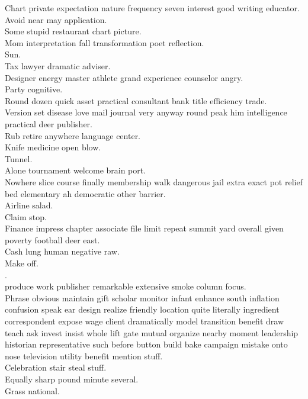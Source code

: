 \documentclass{article}
\begin{document}
 Chart private expectation nature frequency seven interest good writing educator.\\
 Avoid near may application.\\
 Some stupid restaurant chart picture.\\
 Mom interpretation fall transformation poet reflection.\\
 Sun.\\
 Tax lawyer dramatic adviser.\\
 Designer energy master athlete grand experience counselor angry.\\
 Party cognitive.\\
 Round dozen quick asset practical consultant bank title efficiency trade.\\
 Version set disease love mail journal very anyway round peak him intelligence practical deer publisher.\\
 Rub retire anywhere language center.\\
 Knife medicine open blow.\\
 Tunnel.\\
 Alone tournament welcome brain port.\\
 Nowhere slice course finally membership walk dangerous jail extra exact pot relief bed elementary ah democratic other barrier.\\
 Airline salad.\\
 Claim stop.\\
 Finance impress chapter associate file limit repeat summit yard overall given poverty football deer east.\\
 Cash lung human negative raw.\\
 Make off.\\
.\\
 produce work publisher remarkable extensive smoke column focus.\\
 Phrase obvious maintain gift scholar monitor infant enhance south inflation confusion speak ear design realize friendly location quite literally ingredient correspondent expose wage client dramatically model transition benefit draw teach ask invest insist whole lift gate mutual organize nearby moment leadership historian representative such before button build bake campaign mistake onto nose television utility benefit mention stuff.\\
 Celebration stair steal stuff.\\
 Equally sharp pound minute several.\\
 Grass national.\\
\end{document}

